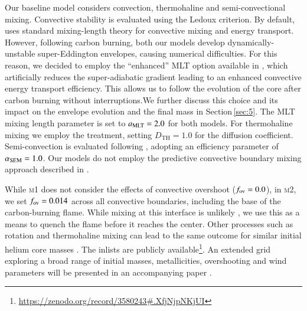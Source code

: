 \documentclass[twocolumn]{aa}
\begin{document}
Our baseline  model considers convection, thermohaline and semi-convectional mixing. Convective stability is 
evaluated using the Ledoux criterion. By default, \mesa uses  standard mixing-length theory  \citep[MTL;][]{cox1968} for convective mixing and energy transport. However, following carbon burning, both our models develop 
dynamically-unstable super-Eddington envelopes, causing numerical 
difficulties. For this reason, we decided to employ the ``enhanced'' MLT 
option available in \mesa \citep{Paxton:2013pj}, which artificially reduces 
the super-adiabatic gradient leading to  an enhanced convective energy 
transport efficiency.  This  allows us to follow the evolution of the core 
after carbon burning without interruptions.We further discuss this choice and its impact on the envelope evolution and the final mass in Section\,\ref{sec:5}. 
The MLT mixing length parameter is set to $a_{\rm MLT}=2.0$ for both models. For 
thermohaline mixing we employ 
the \cite{kippenhahn1980} 
 treatment, setting $D_{\text{TH}} = 1.0$ for the diffusion coefficient. Semi-convection is evaluated following \cite{langer1983}, adopting an efficiency parameter of $\alpha_{{\rm SEM}} = 1.0$. Our models do not employ the predictive convective boundary mixing approach described in \cite{Paxton:2017eie}. 

While \textsc{m1} does not consider the effects of convective overshoot ($f_{\rm ov}=0.0$), in \textsc{m2}, we set $f_{\rm ov}=0.014$ across all convective boundaries, including the base of the 
carbon-burning flame. While mixing at this interface is unlikely \citep{lecoanet2016}, 
we use this as a means to  quench the flame before it reaches the center.  
Other processes such as rotation and thermohaline mixing can lead to the 
same outcome for similar initial helium core masses \citep{Farmer:2015afs}.
The \mesa inlists are publicly available\footnote{\url{https://zenodo.org/record/3580243\#.XfjNjpNKjUI}}. 
An  extended grid exploring a broad range of initial masses, 
metallicities, overshooting and wind parameters will be presented in an 
accompanying paper \citep{chanlaridis2019}.       
\end{document}

